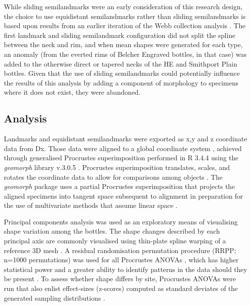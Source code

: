 \documentclass[review]{elsarticle}
\begin{document}
While sliding semilandmarks were an early consideration of this research design, the choice to use equidistant semilandmarks rather than sliding semilandmarks is based upon results from an earlier iteration of the Webb collection analysis \citep[Figure 3]{RN11716}. The first landmark and sliding semilandmark configuration did not split the spline between the neck and rim, and when mean shapes were generated for each type, an anomaly (from the everted rims of Belcher Engraved bottles, in that case) was added to the otherwise direct or tapered necks of the HE and Smithport Plain bottles. Given that the use of sliding semilandmarks could potentially influence the results of this analysis by adding a component of morphology to specimens where it does not exist, they were abandoned.

\subsection{Analysis}

Landmarks and equidistant semilandmarks were exported as x,y and z coordinate data from Dx. Those data were aligned to a global coordinate system \citep{RN11622,RN11623,RN11563}, achieved through generalised Procrustes superimposition \citep{RN478} performed in R 3.4.4 \citep{R} using the \textit{geomorph} library v.3.0.5 \citep{RN11530,RN1774}. Procrustes superimposition translates, scales, and rotates the coordinate data to allow for comparisons among objects \citep{RN11564,RN478}. The \textit{geomorph} package uses a partial Procrustes superimposition that projects the aligned specimens into tangent space subsequent to alignment in preparation for the use of multivariate methods that assume linear space \citep{RN1646,RN11563}.

Principal components analysis \citep{RN1746} was used as an exploratory means of visualising shape variation among the bottles. The shape changes described by each principal axis are commonly visualised using thin-plate spline warping of a reference 3D mesh \citep{RN1731,RN479}. A residual randomisation permutation procedure (RRPP; n=1000 permutations) was used for all Procrustes ANOVAs \citep{RN1655}, which has higher statistical power and a greater ability to identify patterns in the data should they be present \citep{RN1719}. To assess whether shape differs by site, Procrustes ANOVAs \citep{RN1749} were run that also enlist effect-sizes (z-scores) computed as standard deviates of the generated sampling distributions \citep{RN1756}. 
\end{document}
